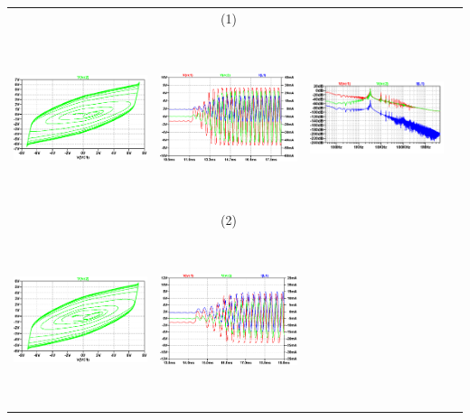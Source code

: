 \documentclass{rbf}
\begin{document}
\begin{table}[h]
\begin{tabular}{c c c c}
        & (1) & \\
        \includegraphics[width=5cm,height=5cm]{r0/ro10_cap.png}&
        \includegraphics[width=5cm,height=5cm]{r0/ro10TS_cap.png}&
        \includegraphics[width=5cm,height=5cm]{r0/ro10.FFT_cap.png}&\\
        & (2) & \\
        \includegraphics[width=5cm,height=5cm]{r0/ro20_cap.png}&
        \includegraphics[width=5cm,height=5cm]{r0/ro20TS_cap.png}&

\end{tabular}
\end{table}
\end{document}

